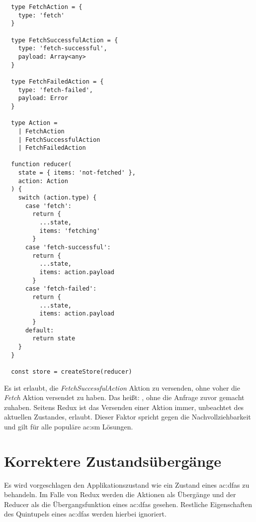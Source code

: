 \begin{lstlisting}
  type FetchAction = {
    type: 'fetch'
  }

  type FetchSuccessfulAction = {
    type: 'fetch-successful',
    payload: Array<any>
  }

  type FetchFailedAction = {
    type: 'fetch-failed',
    payload: Error
  }

  type Action =
    | FetchAction
    | FetchSuccessfulAction
    | FetchFailedAction

  function reducer(
    state = { items: 'not-fetched' }, 
    action: Action
  ) {
    switch (action.type) {
      case 'fetch':
        return {
          ...state,
          items: 'fetching'
        }
      case 'fetch-successful':
        return {
          ...state,
          items: action.payload
        }
      case 'fetch-failed':
        return {
          ...state,
          items: action.payload
        }
      default:
        return state
    }
  }
  
  const store = createStore(reducer)
\end{lstlisting}

Es ist erlaubt, die \textit{FetchSuccessfulAction} Aktion zu versenden, ohne voher die \textit{Fetch} Aktion versendet zu haben. Das heißt: , ohne die Anfrage zuvor gemacht zuhaben. Seitens Redux ist das Versenden einer Aktion immer, unbeachtet des aktuellen Zustandes, erlaubt. Dieser Faktor spricht gegen die Nachvollziehbarkeit und gilt für alle populäre \acrshort{ac:sm} Lösungen.

\section {Korrektere Zustandsübergänge}



Es wird vorgeschlagen den Applikationszustand wie ein Zustand eines \acrlong{ac:dfa}s zu behandeln. Im Falle von Redux werden die Aktionen als Übergänge und der Reducer als die Übergangsfunktion eines \acrlong{ac:dfa}s gesehen. Restliche Eigenschaften des Quintupels eines \acrlong{ac:dfa}s werden hierbei ignoriert.

